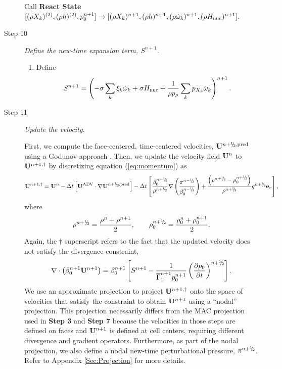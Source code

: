 \begin{description}
Call {\bf React State}$[(\rho X_k)^{(2)},(\rho h)^{(2)}, p_0^{n+1}] \rightarrow [(\rho X_k)^{n+1}, (\rho h)^{n+1}, (\rho \dot\omega_k)^{n+1}, (\rho H_{\rm nuc})^{n+1}].$

\item[Step 10] {\em Define the new-time expansion term, $S^{n+1}$.}

\begin{enumerate}
\renewcommand{\theenumi}{{\bf \Alph{enumi}}}
\item Define
\begin{equation}
  S^{n+1} =  \left(-\sigma  \sum_k  \xi_k \omegadot_k  + \sigma \Hnuc +
  \frac{1}{\rho p_\rho} \sum_k p_{X_k}  \omegadot_k\right)^{n+1}.
\end{equation}

\end{enumerate}


\item[Step 11] {\em Update the velocity}.

First, we compute the face-centered, time-centered velocities, $\Ub^{\nph,\pred}$
using a Godunov approach \citep{XRB_III}. Then, we update
the velocity field ${\bf{U}}^n$ to ${\bf{U}}^{n+1,\dagger}$ by discretizing
equation (\ref{eq:momentum}) as
\begin{equation}
\Ub^{n+1,\dagger}
= \Ub^n - \dt \left[\uadvtwo \cdot \nabla \Ub^{\nph,\pred} \right]
 - \dt \left[ \frac{\beta_0^\nph}{\rho^\nph} \nabla \left( \frac{\pi^\nmh}{\beta_0^\nmh} \right) + \frac{\left(\rho^\nph-\rho_0^\nph\right)}{\rho^\nph} g^{\nph} \eb_r \right],
\end{equation}
where
\begin{equation}
\rho^\nph = \frac{\rho^n + \rho^{n+1}}{2}, \qquad \rho_0^\nph = \frac{\rho_0^n + \rho_0^{n+1}}{2}.
\end{equation}
Again, the $\dagger$ superscript refers
to the fact that the updated velocity does not satisfy the divergence constraint,
\begin{equation}
\nabla \cdot \left(\beta_0^{n+1} \Ub^{n+1} \right) = \beta_0^{n+1} \left[ S^{n+1} - \frac{1}{\gammaonebar^{n+1}p_0^{n+1}}\left(\frac{\partial p_0}{\partial t}\right)^{\nph}\right].\label{eq:div3}
\end{equation}
We use an approximate projection to project ${\bf{U}}^{n+1,\dagger}$ onto the space of velocities that satisfy the constraint to obtain ${\bf{U}}^{n+1}$ using a ``nodal'' projection.
This projection necessarily differs from the MAC projection used in
{\bf Step 3} and {\bf Step 7} because the velocities in those steps are defined
on faces and ${\bf{U}}^{n+1}$ is defined at cell centers, requiring different divergence
and gradient operators.
Furthermore, as part of the nodal projection, we also define a nodal new-time perturbational pressure, $\pi^\nph$.
Refer to Appendix \ref{Sec:Projection} for more details.

\end{description}

